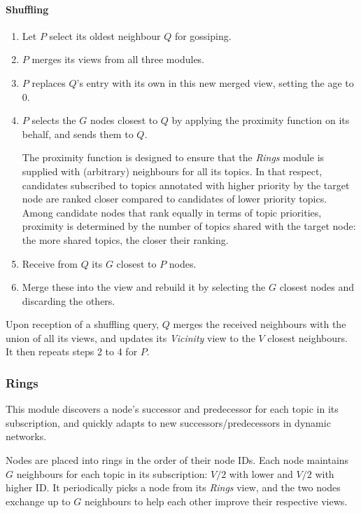 \documentclass[10pt,a4paper,onecolumn]{article}
\begin{document}
\paragraph*{Shuffling}
\begin{enumerate}
\item Let $P$ select its oldest neighbour $Q$ for gossiping.
\item $P$ merges its views from all three modules.
\item $P$ replaces $Q$'s entry with its own in this new merged view, setting the age to 0.
\item $P$ selects the $G$ nodes closest to $Q$ by applying the proximity function on its behalf, and sends them to $Q$. 

The proximity function is designed to ensure that the \textit{Rings} module is supplied with (arbitrary) neighbours for all its topics. In that respect, candidates subscribed to topics annotated with higher priority by the target node are ranked closer compared to candidates of lower priority topics. Among candidate nodes that rank equally in terms of topic priorities, proximity is determined by the number of topics shared with the target node: the more shared topics, the closer their ranking.
\item Receive from $Q$ its $G$ closest to $P$ nodes.
\item Merge these into the view and rebuild it by selecting the $G$ closest nodes and discarding the others.
\end{enumerate}

Upon reception of a shuffling query, $Q$ merges the received neighbours with the union of all its views, and updates its \textit{Vicinity} view to the $V$ closest neighbours. It then repeats steps 2 to 4 for $P$. 

\subsubsection{Rings}
This module discovers a node's successor and predecessor for each topic in its subscription, and quickly adapts to new successors/predecessors in dynamic networks.

Nodes are placed into rings in the order of their node IDs. Each node maintains $G$ neighbours for each topic in its subscription: $V/2$ with lower and $V/2$ with higher ID. It periodically picks a node from its \textit{Rings} view, and the two nodes exchange up to $G$ neighbours to help each other improve their respective views.
\end{document}
